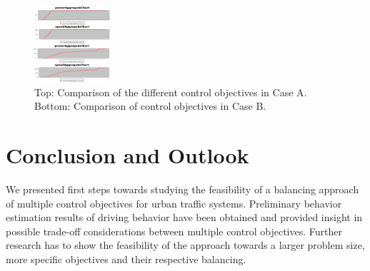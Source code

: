 \documentclass[conference]{../cls/IEEEtran}
\begin{document}
\begin{figure}[t!]
	\includegraphics[width=\columnwidth]{../gfx/placeholder.pdf}
	\caption{Top: Comparison of the different control objectives in Case A. Bottom:
	Comparison of control objectives in Case B.}
	\label{figure:results}
\end{figure}


\section{Conclusion and Outlook}

We presented first steps towards studying the feasibility of a balancing
approach of multiple control objectives for urban traffic systems.
Preliminary behavior estimation results of driving behavior have been obtained and provided insight 
in possible trade-off considerations between multiple control objectives.
Further research has to show the feasibility of the approach towards a larger
problem size, more specific objectives and their respective balancing.



\end{document}
